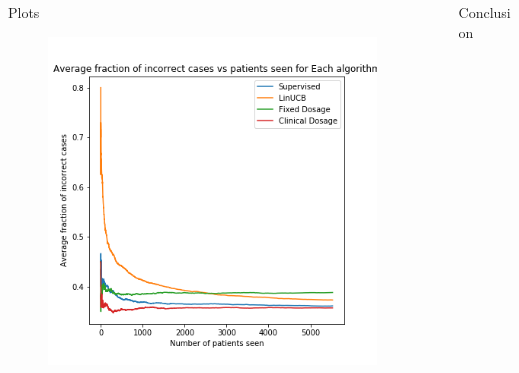 \documentclass[final, 14pt]{beamer}
\newlength{\sepwid}
\newlength{\onecolwid}
\newlength{\twocolwid}
\begin{document}
\begin{frame}[t]
\begin{columns}[t]
\begin{column}{\twocolwid}
\begin{columns}[t,totalwidth=\twocolwid]
\begin{column}{\onecolwid}
\begin{block}{Plots}
\begin{figure}
	\includegraphics[width=\linewidth]{../plots/avg_frac_algos.png}
\end{figure}


\end{block}


\end{column} %

\end{columns} %

\end{column} %

\begin{column}{\sepwid}\end{column} %

\begin{column}{\onecolwid} %


\begin{block}{Conclusion}


\end{block}
\end{column}
\end{columns}
\end{frame}
\end{document}
